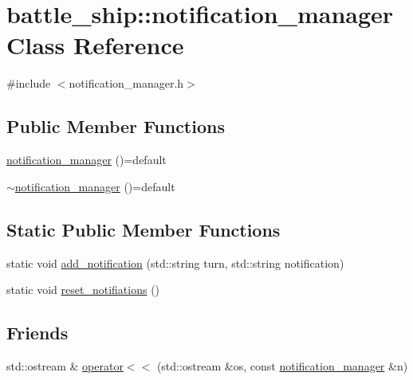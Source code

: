 \hypertarget{classbattle__ship_1_1notification__manager}{}\section{battle\+\_\+ship\+:\+:notification\+\_\+manager Class Reference}
\label{classbattle__ship_1_1notification__manager}


{\ttfamily \#include $<$notification\+\_\+manager.\+h$>$}

\subsection*{Public Member Functions}
\begin{DoxyCompactItemize}
\item 
\hyperlink{classbattle__ship_1_1notification__manager_a87ccb2f8410219be087e216ae0dd0512}{notification\+\_\+manager} ()=default
\item 
\hyperlink{classbattle__ship_1_1notification__manager_ac6581333d9b6fb0fd4d66432bab5e1f4}{$\sim$notification\+\_\+manager} ()=default
\end{DoxyCompactItemize}
\subsection*{Static Public Member Functions}
\begin{DoxyCompactItemize}
\item 
static void \hyperlink{classbattle__ship_1_1notification__manager_abb17bb5ac063b9ba4e7d0aa8a15e3628}{add\+\_\+notification} (std\+::string turn, std\+::string notification)
\item 
static void \hyperlink{classbattle__ship_1_1notification__manager_ad5b73a016f63f919695dd8387c895d50}{reset\+\_\+notifiations} ()
\end{DoxyCompactItemize}
\subsection*{Friends}
\begin{DoxyCompactItemize}
\item 
std\+::ostream \& \hyperlink{classbattle__ship_1_1notification__manager_ae88cf18d6c7447486803aa949db9b667}{operator$<$$<$} (std\+::ostream \&os, const \hyperlink{classbattle__ship_1_1notification__manager}{notification\+\_\+manager} \&n)
\end{DoxyCompactItemize}


